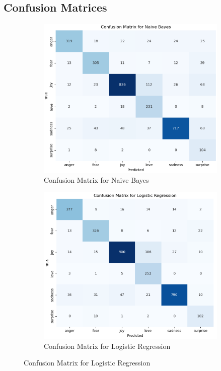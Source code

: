 \clearpage



\subsection{Confusion Matrices}

\begin{figure}[h!]
	\centering
	\begin{subfigure}[b]{0.45\textwidth}
		\centering
		\includegraphics[width=\textwidth]{confusion_matrix_01.png}
		\caption{Confusion Matrix for Naive Bayes}
		\label{fig:final_confusion_matrix_naive_bayes}
	\end{subfigure}
	\hfill
	\begin{subfigure}[b]{0.45\textwidth}
		\centering
		\includegraphics[width=\textwidth]{confusion_matrix_01.1.png}
		\caption{Confusion Matrix for Logistic Regression}
		\label{fig:final_confusion_matrix_logistic_regression}
	\end{subfigure}
	

\end{figure}
